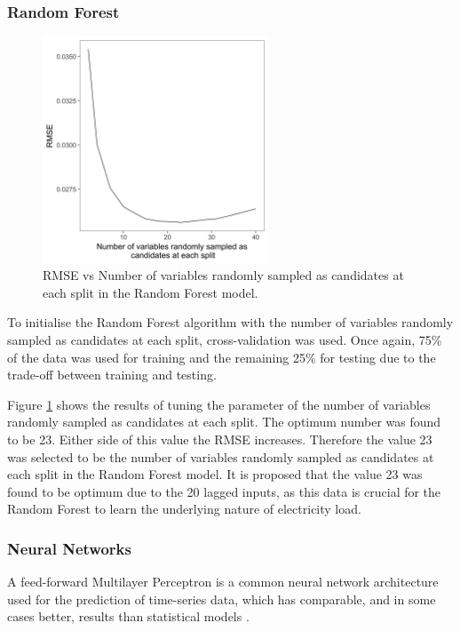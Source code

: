 \subsubsection{Random Forest}

\begin{figure}
	\centering
	\includegraphics[width=0.6\textwidth]{Chapter5/figures/short-term-forecasting/rforest_parameter_tuning}
	\caption{RMSE vs Number of variables randomly sampled as candidates at each split in the Random Forest model.}
	\label{fig:rf_param_tune}
\end{figure}

To initialise the Random Forest algorithm with the number of variables randomly sampled as candidates at each split, cross-validation was used. Once again, 75\% of the data was used for training and the remaining 25\% for testing due to the trade-off between training and testing.

Figure \ref{fig:rf_param_tune} shows the results of tuning the parameter of the number of variables randomly sampled as candidates at each split. The optimum number was found to be 23. Either side of this value the RMSE increases. Therefore the value 23 was selected to be the number of variables randomly sampled as candidates at each split in the Random Forest model. It is proposed that the value 23 was found to be optimum due to the 20 lagged inputs, as this data is crucial for the Random Forest to learn the underlying nature of electricity load.


\subsubsection{Neural Networks}

A feed-forward Multilayer Perceptron is a common neural network architecture used for the prediction of time-series data, which has comparable, and in some cases better, results than statistical models \cite{Hill1994}. 

